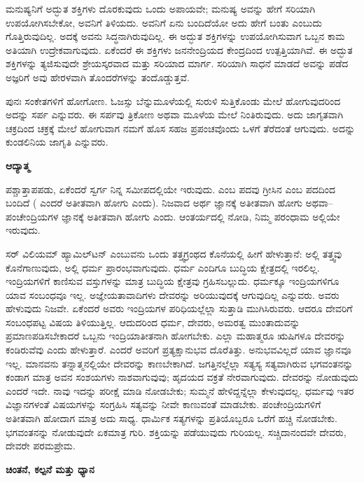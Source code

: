 ಮನುಷ್ಯನಿಗೆ ಅದ್ಭುತ ಶಕ್ತಿಗಳು ದೊರಕುವುದು ಒಂದು ಅಪಾಯವೇ; ಮನುಷ್ಯ ಅವನ್ನು ಹೇಗೆ ಸರಿಯಾಗಿ ಉಪಯೋಗಿಸಬೇಕೋ, ಅವನಿಗೆ ತಿಳಿಯದು. ಅವನಿಗೆ ಏನು ಬಂದಿದೆಯೋ ಅದು ಹೇಗೆ ಬಂತು ಎಂಬುದು ಗೊತ್ತಿರುವುದಿಲ್ಲ. ಅದಕ್ಕೆ ಅವನು ಸಿದ್ಧನಾಗಿರುವುದಿಲ್ಲ. ಈ ಅದ್ಭುತ ಶಕ್ತಿಗಳನ್ನು ಉಪಯೋಗಿಸುವಾಗ ಒಬ್ಬನ ಕಾಮ ಅತಿಯಾಗಿ ಉದ್ರೇಕವಾಗುವುದು. ಏಕೆಂದರೆ ಈ ಶಕ್ತಿಗಳು ಜನನೇಂದ್ರಿಯದ ಕೇಂದ್ರದಿಂದ ಉತ್ಪತ್ತಿಯಾಗಿವೆ. ಈ ಅದ್ಭುತ ಶಕ್ತಿಗಳನ್ನು ತ್ಯಜಿಸುವುದೇ ಶ್ರೇಯಸ್ಕರವಾದ ಮತ್ತು ಸರಿಯಾದ ಮಾರ್ಗ. ಸರಿಯಾಗಿ ಸಾಧನೆ ಮಾಡದೆ ಅವನ್ನು ಪಡೆದ ಅಜ್ಞರಿಗೆ ಅವು ಹೇರಳವಾಗಿ ತೊಂದರೆಗಳನ್ನು ತಂದೊಡ್ಡುತ್ತವೆ.

ಪುನಃ ಸಂಕೇತಗಳಿಗೆ ಹೋಗೋಣ. ಓಜಸ್ಸು ಬೆನ್ನುಮೂಳೆಯಲ್ಲಿ ಸುರುಳಿ ಸುತ್ತಿಕೊಂಡು ಮೇಲೆ ಹೋಗುವುದರಿಂದ ಅದನ್ನು ಸರ್ಪ ಎನ್ನುವರು. ಈ ಸರ್ಪವು ತ್ರಿಕೋಣ ಅಥವಾ ಮೂಳೆಯ ಮೇಲೆ ನಿಂತಿರುವುದು. ಅದು ಜಾಗೃತವಾಗಿ ಚಕ್ರದಿಂದ ಚಕ್ರಕ್ಕೆ ಮೇಲೆ ಹೋಗುವಾಗ ನಮಗೆ ಹೊಸ ಸಹಜ ಪ್ರಪಂಚವೊಂದು ಒಳಗೆ ತೆರೆದಂತೆ ಆಗುವುದು. ಅದನ್ನು ಕುಂಡಲಿನಿಯ ಜಾಗೃತಿ ಎನ್ನುವರು.

\quad\qquad\qquad\qquad\qquad\textbf{ಆದ್ಯಾತ್ಮ}

ಪಶ್ಚಾತ್ತಾಪಪಡು, ಏಕೆಂದರೆ ಸ್ವರ್ಗ ನಿನ್ನ ಸಮೀಪದಲ್ಲಿಯೇ ಇರುವುದು.  ಎಂಬ ಪದವು ಗ್ರೀಸಿನ  ಎಂಬ ಪದದಿಂದ ಬಂದಿದೆ ( ಎಂದರೆ ಅತೀತವಾಗಿ ಹೋಗು ಎಂದು). ನಿಜವಾದ ಅರ್ಥ ಜ್ಞಾನಕ್ಕೆ ಅತೀತವಾಗಿ ಹೋಗು ಅಥವಾ–ಪಂಚೇಂದ್ರಿಯಗಳ ಜ್ಞಾನಕ್ಕೆ ಅತೀತವಾಗಿ ಹೋಗು ಎಂದು. ಆಂತರ್ಯದಲ್ಲಿ ನೋಡಿ, ನಿಮ್ಮ ಪರಂಧಾಮ ಅಲ್ಲಿಯೇ ಇರುವುದು.

ಸರ್​ ವಿಲಿಯಮ್​ ಹ್ಯಾಮಿಲ್​ಟನ್​ ಎಂಬುವನು ಒಂದು ತತ್ತ್ವಗ್ರಂಥದ ಕೊನೆಯಲ್ಲಿ ಹೀಗೆ ಹೇಳುತ್ತಾನೆ: ಅಲ್ಲಿ ತತ್ತ್ವವು ಕೊನೆಗಾಣುವುದು, ಅಲ್ಲಿ ಧರ್ಮ ಪ್ರಾರಂಭವಾಗುವುದು. ಧರ್ಮ ಎಂದಿಗೂ ಬುದ್ಧಿಯ ಕ್ಷೇತ್ರದಲ್ಲಿ ಇರಲಿಲ್ಲ. ಇಂದ್ರಿಯಗಳಿಗೆ ಕಾಣಿಸುವ ವಸ್ತುಗಳನ್ನು ಮಾತ್ರ ಬುದ್ಧಿಯ ಕ್ಷೇತ್ರವು ಗ್ರಹಿಸಬಲ್ಲುದು. ಧರ್ಮಕ್ಕೂ ಇಂದ್ರಿಯಗಳಿಗೂ ಯಾವ ಸಂಬಂಧವೂ ಇಲ್ಲ. ಅಜ್ಞೇಯತಾವಾದಿಗಳು ದೇವರನ್ನು ಅರಿಯುವುದಕ್ಕೆ ಆಗುವುದಿಲ್ಲ ಎನ್ನುವರು. ಅವರು ಹೇಳುವುದು ನಿಜವೇ. ಏಕೆಂದರೆ ಅವರು ಇಂದ್ರಿಯಗಳ ಪರಿಧಿಯಲ್ಲೆಲ್ಲಾ ಸುತ್ತಾಡಿ ಮುಗಿಸಿರುವರು. ಆದರೂ ದೇವರಿಗೆ ಸಂಬಂಧಪಟ್ಟ ವಿಷಯ ತಿಳಿಯುತ್ತಿಲ್ಲ. ಆದುದರಿಂದ ಧರ್ಮ, ದೇವರು, ಅಮರತ್ವ ಮುಂತಾದುವನ್ನು ಪ್ರಮಾಣಪಡಿಸಬೇಕಾದರೆ ಒಬ್ಬನು ಇಂದ್ರಿಯಾತೀತನಾಗಿ ಹೋಗಬೇಕು. ಎಲ್ಲಾ ಮಹಾತ್ಮರೂ ಋಷಿಗಳೂ ದೇವರನ್ನು ಕಂಡಿರುವೆವು ಎಂದು ಹೇಳುತ್ತಾರೆ. ಎಂದರೆ ಅವರಿಗೆ ಪ್ರತ್ಯಕ್ಷಾನುಭವ ದೊರೆತಿತ್ತು. ಅನುಭವವಿಲ್ಲದೆ ಯಾವ ಜ್ಞಾನವೂ ಇಲ್ಲ. ಮಾನವನು ತನ್ನಾತ್ಮನಲ್ಲಿಯೇ ದೇವರನ್ನು ಕಾಣಬೇಕಾಗಿದೆ. ಜಗತ್ತಿನಲ್ಲೆಲ್ಲಾ ಸತ್ಯಸ್ಯ ಸತ್ಯವಾಗಿರುವ ಭಗವಂತನನ್ನು ಕಂಡಾಗ ಮಾತ್ರ ಅವನ ಸಂಶಯಗಳು ನಾಶವಾಗುವುವು; ಹೃದಯದ ವಕ್ರತೆ ನೇರವಾಗುವುದು. ದೇವರನ್ನು ನೋಡುವುದು ಎಂದರೆ ಇದೇ. ನಾವು ಇದನ್ನು ಪರೀಕ್ಷೆ ಮಾಡಿ ನೋಡಬೇಕು; ಸುಮ್ಮನೆ ಹೇಳಿದ್ದನ್ನೆಲ್ಲಾ ಕೇಳುವುದಲ್ಲ. ಧರ್ಮವು ಇತರ ವಿಜ್ಞಾನಗಳಂತೆ ವಿಷಯಗಳನ್ನು ಸಂಗ್ರಹಿಸಿ ಸತ್ಯವನ್ನು ನೀವೇ ಕಾಣುವಂತೆ ಮಾಡಬೇಕು. ಪಂಚೇಂದ್ರಿಯಗಳಿಗೆ ಅತೀತವಾಗಿ ಹೋದಾಗ ಮಾತ್ರ ಅದು ಸಾಧ್ಯ. ಧಾರ್ಮಿಕ ಸತ್ಯಗಳನ್ನು ಪ್ರತಿಯೊಬ್ಬರೂ ಒರೆಗೆ ಹಚ್ಚಿ ನೋಡಬೇಕು. ಭಗವಂತನನ್ನು ನೋಡುವುದೇ ಏಕಮಾತ್ರ ಗುರಿ. ಶಕ್ತಿಯನ್ನು ಪಡೆಯುವುದು ಗುರಿಯಲ್ಲ. ಸಚ್ಚಿದಾನಂದವೇ ದೇವರು, ದೇವರೇ ಪರಮಪ್ರೇಮ.

\eject

\quad\qquad\qquad\qquad\textbf{ಚಿಂತನೆ, ಕಲ್ಪನೆ ಮತ್ತು ಧ್ಯಾನ}

